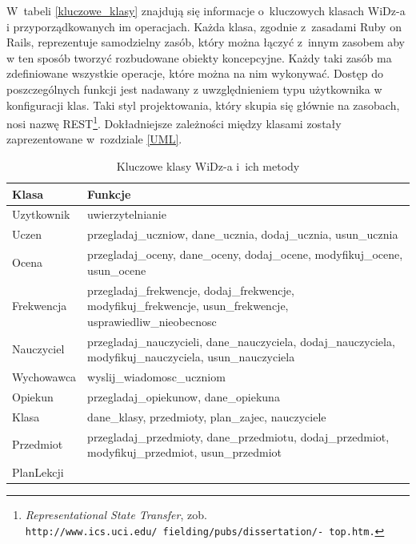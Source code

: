 \documentclass[12pt,leqno,twoside]{mwart}
\begin{document}
\indent W~tabeli \ref{kluczowe_klasy} znajdują się informacje o~kluczowych klasach WiDz-a i przyporządkowanych im operacjach. Każda klasa, zgodnie z~zasadami Ruby on Rails, reprezentuje samodzielny zasób, który można łączyć z~innym zasobem aby w ten sposób tworzyć rozbudowane obiekty koncepcyjne. Każdy taki zasób ma zdefiniowane wszystkie operacje, które można na nim wykonywać. Dostęp do poszczególnych funkcji jest nadawany z uwzględnieniem typu użytkownika w konfiguracji klas. Taki styl projektowania, który skupia się głównie na zasobach, nosi nazwę REST\footnote{\textit{Representational State Transfer}, zob. \tt{http://www.ics.uci.edu/~fielding/pubs/dissertation/}\rm{-} \tt{top.htm}.}. Dokładniejsze zależności między klasami zostały zaprezentowane w~rozdziale \ref{UML}.
\begin{table}[h]
	\centering
	\caption{Kluczowe klasy WiDz-a i~ich metody}
		\rule{0pt}{3ex}
		\begin{tabular}{|l|p{12cm}|}
		\hline
		\textbf{Klasa} & \textbf{Funkcje} \\ \hline
		Uzytkownik & uwierzytelnianie \\ \hline
		Uczen & 
			\parbox[t]{12cm}{
			\raggedright
				przegladaj\_uczniow, dane\_ucznia, dodaj\_ucznia, usun\_ucznia
			}\\ \hline
		Ocena & 
			\parbox[t]{12cm}{
			\raggedright
				przegladaj\_oceny, dane\_oceny, dodaj\_ocene, modyfikuj\_ocene, usun\_ocene
			} \\ \hline
		Frekwencja &
			\parbox[t]{12cm}{
			\raggedright			
				przegladaj\_frekwencje, dodaj\_frekwencje, modyfikuj\_frekwencje, usun\_frekwencje, usprawiedliw\_nieobecnosc
			}\\ \hline
		Nauczyciel &
			\parbox[t]{12cm}{
			\raggedright			
				przegladaj\_nauczycieli, dane\_nauczyciela, dodaj\_nauczyciela, modyfikuj\_nauczyciela, usun\_nauczyciela
			} \\ \hline
		Wychowawca & wyslij\_wiadomosc\_uczniom \\ \hline
		Opiekun & przegladaj\_opiekunow, dane\_opiekuna \\ \hline
		Klasa & dane\_klasy, przedmioty, plan\_zajec, nauczyciele \\ \hline
		Przedmiot &
			\parbox[t]{12cm}{
			\raggedright			
				przegladaj\_przedmioty, dane\_przedmiotu, dodaj\_przedmiot, modyfikuj\_przedmiot, usun\_przedmiot 
			}\\ \hline
		PlanLekcji &
			\parbox[t]{12cm}{
			\raggedright			
}
\end{tabular}
\end{table}
\end{document}
